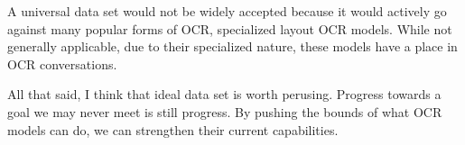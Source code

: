 \documentclass[sigplan,screen,nonacm]{acmart-tagged}
\begin{document}
A universal data set would not be widely accepted because it would actively go against many popular forms of OCR, specialized layout OCR models. While not generally applicable, due to their specialized nature, these models have a place in OCR conversations.

All that said, I think that ideal data set is worth perusing. Progress towards a goal we may never meet is still progress. By pushing the bounds of what OCR models can do, we can strengthen their current capabilities.


%
%

\end{document}
